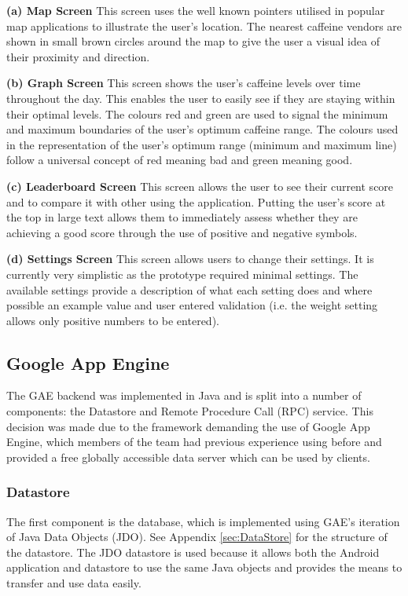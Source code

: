 \textbf{(a) Map Screen} \newline         
This screen uses the well known pointers utilised in popular map applications to illustrate the user’s location. The nearest caffeine vendors are shown in small brown circles around the map to give the user a visual idea of their proximity and direction.
                   
\textbf{(b) Graph Screen} \newline            
This screen shows the user’s caffeine levels over time throughout the day. This enables the user to easily see if they are staying within their optimal levels. The colours red and green are used to signal the minimum and maximum boundaries of the user’s optimum caffeine range. The colours used in the representation of the user’s optimum range (minimum and maximum line) follow a universal concept of red meaning bad and green meaning good.
                   
\textbf{(c) Leaderboard Screen} \newline     
This screen allows the user to see their current score and to compare it with other using the application. Putting the user’s score at the top in large text allows them to immediately assess whether they are achieving a good score through the use of positive and negative symbols.
                   
\textbf{(d) Settings Screen} \newline  
This screen allows users to change their settings. It is currently very simplistic as the prototype required minimal settings. The available settings provide a description of what each setting does and where possible an example value and user entered validation (i.e. the weight setting allows only positive numbers to be entered).

\subsection{Google App Engine}      
The GAE backend was implemented in Java and is split into a number of components: the Datastore and Remote Procedure Call (RPC) service. This decision was made due to the framework demanding the use of Google App Engine, which members of the team had previous experience using before and provided a free globally accessible data server which can be used by clients.
                       
\subsubsection{Datastore}
The first component is the database, which is implemented using GAE’s iteration of Java Data Objects (JDO). See Appendix \ref{sec:DataStore} for the structure of the datastore. The JDO datastore is used because it allows both the Android application and datastore to use the same Java objects and provides the means to transfer and use data easily.
                   
